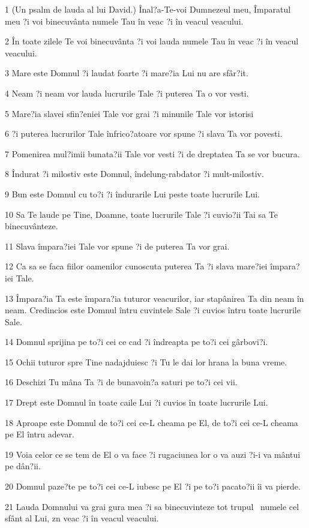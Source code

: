 \par 1 (Un psalm de lauda al lui David.) Înal?a-Te-voi Dumnezeul meu, Împaratul meu ?i voi binecuvânta numele Tau în veac ?i în veacul veacului.
\par 2 În toate zilele Te voi binecuvânta ?i voi lauda numele Tau în veac ?i în veacul veacului.
\par 3 Mare este Domnul ?i laudat foarte ?i mare?ia Lui nu are sfâr?it.
\par 4 Neam ?i neam vor lauda lucrurile Tale ?i puterea Ta o vor vesti.
\par 5 Mare?ia slavei sfin?eniei Tale vor grai ?i minunile Tale vor istorisi
\par 6 ?i puterea lucrurilor Tale înfrico?atoare vor spune ?i slava Ta vor povesti.
\par 7 Pomenirea mul?imii bunata?ii Tale vor vesti ?i de dreptatea Ta se vor bucura.
\par 8 Îndurat ?i milostiv este Domnul, îndelung-rabdator ?i mult-milostiv.
\par 9 Bun este Domnul cu to?i ?i îndurarile Lui peste toate lucrurile Lui.
\par 10 Sa Te laude pe Tine, Doamne, toate lucrurile Tale ?i cuvio?ii Tai sa Te binecuvânteze.
\par 11 Slava împara?iei Tale vor spune ?i de puterea Ta vor grai.
\par 12 Ca sa se faca fiilor oamenilor cunoscuta puterea Ta ?i slava mare?iei împara?iei Tale.
\par 13 Împara?ia Ta este împara?ia tuturor veacurilor, iar stapânirea Ta din neam în neam. Credincios este Domnul întru cuvintele Sale ?i cuvios întru toate lucrurile Sale.
\par 14 Domnul sprijina pe to?i cei ce cad ?i îndreapta pe to?i cei gârbovi?i.
\par 15 Ochii tuturor spre Tine nadajduiesc ?i Tu le dai lor hrana la buna vreme.
\par 16 Deschizi Tu mâna Ta ?i de bunavoin?a saturi pe to?i cei vii.
\par 17 Drept este Domnul în toate caile Lui ?i cuvios în toate lucrurile Lui.
\par 18 Aproape este Domnul de to?i cei ce-L cheama pe El, de to?i cei ce-L cheama pe El întru adevar.
\par 19 Voia celor ce se tem de El o va face ?i rugaciunea lor o va auzi ?i-i va mântui pe dân?ii.
\par 20 Domnul paze?te pe to?i cei ce-L iubesc pe El ?i pe to?i pacato?ii îi va pierde.
\par 21 Lauda Domnului va grai gura mea ?i sa binecuvinteze tot trupul  numele cel sfânt al Lui, zn veac ?i în veacul veacului.

